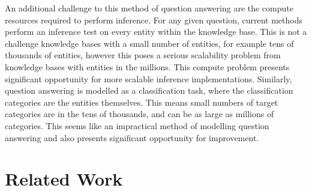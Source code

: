 An additional challenge to this method of question answering are the compute resources required to perform inference. For any given question, current methods perform an inference test on every entity within the knowledge base. This is not a challenge knowledge bases with a small number of entities, for example tens of thousands of entities, however this poses a serious scalability problem from knowledge bases with entities in the millions. This compute problem presents significant opportunity for more scalable inference implementations. Similarly, question answering is modelled as a classification task, where the classification categories are the entities themselves. This means small numbers of target categories are in the tens of thousands, and can be as large as millions of categories. This seems like an impractical method of modelling question answering and also presents significant opportunity for improvement. 



\section{Related Work} %


